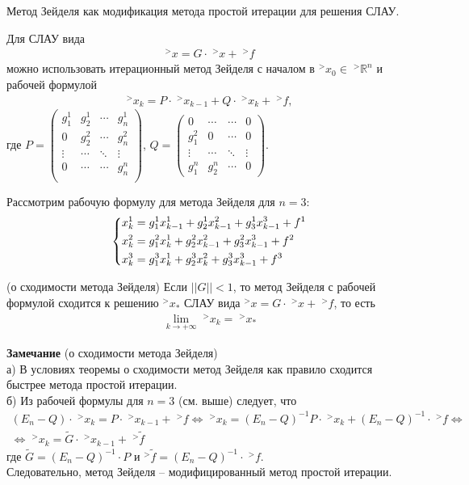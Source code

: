 \documentclass[__main__.tex]{subfiles}
\begin{document}
Метод Зейделя как модификация метода простой итерации для решения СЛАУ.


Для СЛАУ вида 
\begin{gather*}
^>x=G\cdot \;^>x+\;^>f
\end{gather*}
можно использовать итерационный метод Зейделя с началом в $^>x_0\in \;^>\mathbb R^n$ и рабочей формулой 
\begin{gather*}
^>x_k=P\cdot \;^>x_{k-1}+Q\cdot \;^>x_k+ \;^>f,
\end{gather*}
где $P=\left(
\begin{matrix}
g^1_1 & g^1_2 & \cdots & g^1_n \\
0 & g^2_2 & \cdots & g^2_n \\
\vdots & \cdots & \ddots & \vdots \\
0 & \cdots & \cdots & g^n_n \\
\end{matrix}
\right)$, $Q = \left(
\begin{matrix}
0 & \cdots & \cdots & 0 \\
g^2_1 & 0 & \cdots & 0 \\
\vdots & \cdots & \ddots & \vdots \\
g^n_1 & g^n_2 & \cdots & 0
\end{matrix}
\right)$.

Рассмотрим рабочую формулу для метода Зейделя для $n=3$:
\begin{gather*}
\left\{
	\begin{gathered}
	x^1_k=g^1_1x^1_{k-1}+g^1_2x^2_{k-1}+g^1_3x^3_{k-1} + f^1 \hfill \\
	x^2_k=g^2_1x^1_{k}+g^2_2x^2_{k-1}+g^2_3x^3_{k-1} + f^2 \hfill \\
	x^3_k=g^3_1x^1_{k}+g^3_2x^2_{k}+g^3_3x^3_{k-1} + f^3 \hfill \\
	\end{gathered}
\right.
\end{gather*}
\begin{theorem}
(о сходимости метода Зейделя) Если $||G||<1$, то метод Зейделя с рабочей формулой сходится к решению $^>x_*$ СЛАУ вида $^>x=G\cdot \;^>x+\;^>f$, то есть 
\begin{gather*}
\lim\limits_{k\rightarrow +\infty} \;^>x_k=\;^>x_*
\end{gather*}
\end{theorem}
\textbf{Замечание} (о сходимости метода Зейделя) \\
а) В условиях теоремы о сходимости метод Зейделя как правило сходится быстрее метода простой итерации. \\
б) Из рабочей формулы для $n=3$ (см. выше) следует, что
\begin{gather*}
(E_n-Q)\cdot \;^>x_k=P\cdot \;^>x_{k-1}+\;^>f \Longleftrightarrow \;^>x_k=(E_n-Q)^{-1}P\cdot \;^>x_k + (E_n-Q)^{-1}\cdot \;^>f \Longleftrightarrow \\
\Longleftrightarrow  \;^>x_k = \tilde{G}\cdot \;^>x_{k-1}+\;^>\tilde{f}
\end{gather*}
где $\tilde{G}=(E_n-Q)^{-1}\cdot P$ и $^>\tilde{f}=(E_n-Q)^{-1}\cdot \;^>f$.\\
Следовательно, метод Зейделя -- модифицированный метод простой итерации.
\end{document}
